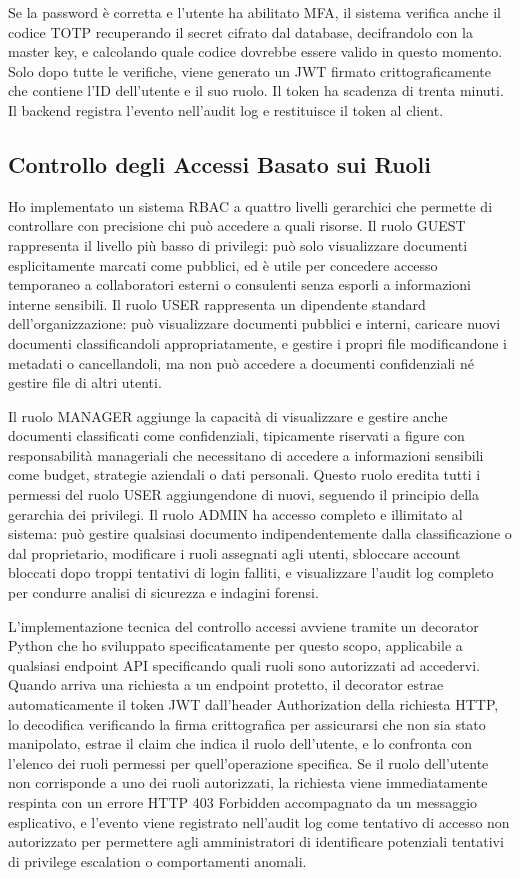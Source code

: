 \documentclass[12pt, a4paper]{article}
\begin{document}
Se la password è corretta e l'utente ha abilitato MFA, il sistema verifica anche il codice TOTP recuperando il secret cifrato dal database, decifrandolo con la master key, e calcolando quale codice dovrebbe essere valido in questo momento. Solo dopo tutte le verifiche, viene generato un JWT firmato crittograficamente che contiene l'ID dell'utente e il suo ruolo. Il token ha scadenza di trenta minuti. Il backend registra l'evento nell'audit log e restituisce il token al client.

\subsection{Controllo degli Accessi Basato sui Ruoli}

Ho implementato un sistema RBAC a quattro livelli gerarchici che permette di controllare con precisione chi può accedere a quali risorse. Il ruolo GUEST rappresenta il livello più basso di privilegi: può solo visualizzare documenti esplicitamente marcati come pubblici, ed è utile per concedere accesso temporaneo a collaboratori esterni o consulenti senza esporli a informazioni interne sensibili. Il ruolo USER rappresenta un dipendente standard dell'organizzazione: può visualizzare documenti pubblici e interni, caricare nuovi documenti classificandoli appropriatamente, e gestire i propri file modificandone i metadati o cancellandoli, ma non può accedere a documenti confidenziali né gestire file di altri utenti.

Il ruolo MANAGER aggiunge la capacità di visualizzare e gestire anche documenti classificati come confidenziali, tipicamente riservati a figure con responsabilità manageriali che necessitano di accedere a informazioni sensibili come budget, strategie aziendali o dati personali. Questo ruolo eredita tutti i permessi del ruolo USER aggiungendone di nuovi, seguendo il principio della gerarchia dei privilegi. Il ruolo ADMIN ha accesso completo e illimitato al sistema: può gestire qualsiasi documento indipendentemente dalla classificazione o dal proprietario, modificare i ruoli assegnati agli utenti, sbloccare account bloccati dopo troppi tentativi di login falliti, e visualizzare l'audit log completo per condurre analisi di sicurezza e indagini forensi.

L'implementazione tecnica del controllo accessi avviene tramite un decorator Python che ho sviluppato specificatamente per questo scopo, applicabile a qualsiasi endpoint API specificando quali ruoli sono autorizzati ad accedervi. Quando arriva una richiesta a un endpoint protetto, il decorator estrae automaticamente il token JWT dall'header Authorization della richiesta HTTP, lo decodifica verificando la firma crittografica per assicurarsi che non sia stato manipolato, estrae il claim che indica il ruolo dell'utente, e lo confronta con l'elenco dei ruoli permessi per quell'operazione specifica. Se il ruolo dell'utente non corrisponde a uno dei ruoli autorizzati, la richiesta viene immediatamente respinta con un errore HTTP 403 Forbidden accompagnato da un messaggio esplicativo, e l'evento viene registrato nell'audit log come tentativo di accesso non autorizzato per permettere agli amministratori di identificare potenziali tentativi di privilege escalation o comportamenti anomali.
\end{document}

